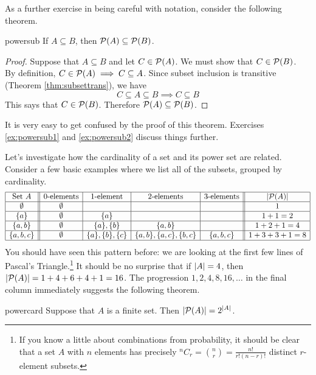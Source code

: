 As a further exercise in being careful with notation, consider the following theorem.

\begin{thm}{}{powersub}
	If $A\subseteq B$, then $\mathcal{P}(A)\subseteq\mathcal{P}(B)$.
\end{thm}

\begin{proof}
	Suppose that $A\subseteq B$ and let $C\in\mathcal{P}(A)$. We must show that $C\in\mathcal{P}(B)$.\\
	By definition, $C\in\mathcal{P}(A)\implies C\subseteq A$. Since subset inclusion is transitive (Theorem \hyperlink{thm:subsettranslnk}{\ref*{thm:subsettrans}}), we have
	\[
		C\subseteq A\subseteq B\implies C\subseteq B
	\]
	This says that $C\in\mathcal{P}(B)$. Therefore $\mathcal{P}(A)\subseteq\mathcal{P}(B)$.
\end{proof}

It is very easy to get confused by the proof of this theorem. Exercises \ref{ex:powersub1} and \ref{ex:powersub2} discuss things further.



Let's investigate how the cardinality of a set and its power set are related. Consider a few basic examples where we list all of the subsets, grouped by cardinality.
\[
	\begin{array}{|c||c|c|c|c||c|}
		\hline
		\text{Set }A&\text{0-elements}&\text{1-element}&\text{2-elements}&\text{3-elements}&\left| \mathcal{P}(A)\right|\\\hline
		\emptyset&\emptyset&&&&1\\\hline
		\{a\}&\emptyset&\{a\}&&&1+1=2\\\hline
		\{a,b\}&\emptyset&\{a\},\{b\}&\{a,b\}&&1+2+1=4\\\hline
		\{a,b,c\}&\emptyset&\{a\},\{b\},\{c\}&\{a,b\},\{a,c\},\{b,c\}&\{a,b,c\}&1+3+3+1=8\\\hline
	\end{array}
\]
You should have seen this pattern before: we are looking at the first few lines of Pascal's Triangle.\footnote{If you know a little about combinations from probability, it should be clear that a set $A$ with $n$ elements has precisely ${}^nC_r=\binom nr=\frac{n!}{r!(n-r)!}$ distinct $r$-element subsets.} It should be no surprise that if $\left| A\right|=4$, then $\left| \mathcal{P}(A)\right|=1+4+6+4+1=16$. The progression $1,2,4,8,16,\ldots$ in the final column immediately suggests the following theorem.

\begin{thm}{}{powercard}
	Suppose that $A$ is a finite set. Then $\left| \mathcal{P}(A)\right|=2^{\left| A\right|}$.
\end{thm}

